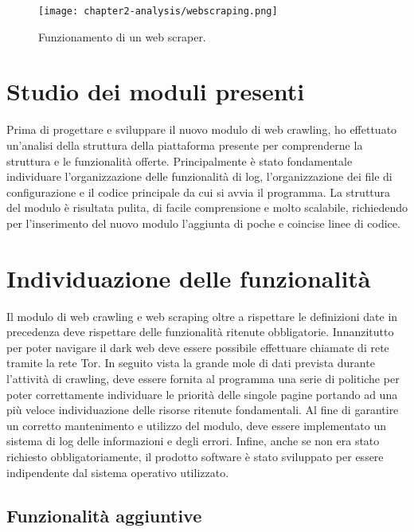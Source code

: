 \begin{figure}[!h] 
    \centering 
    \texttt{[image: chapter2-analysis/webscraping.png]} 
    \caption{Funzionamento di un web scraper.}
\end{figure}


\section{Studio dei moduli presenti}

Prima di progettare e sviluppare il nuovo modulo di web crawling, ho effettuato un’analisi della struttura della piattaforma presente per comprenderne la struttura e le funzionalità offerte. Principalmente è stato fondamentale individuare l'organizzazione delle funzionalità di log, l'organizzazione dei file di configurazione e il codice principale da cui si avvia il programma. La struttura del modulo è risultata pulita, di facile comprensione e molto scalabile, richiedendo per l'inserimento del nuovo modulo l'aggiunta di poche e coincise linee di codice.


\section{Individuazione delle funzionalità}

Il modulo di web crawling e web scraping oltre a rispettare le definizioni date in precedenza deve rispettare delle funzionalità ritenute obbligatorie. Innanzitutto per poter navigare il dark web deve essere possibile effettuare chiamate di rete tramite la rete Tor. In seguito vista la grande mole di dati prevista durante l'attività di crawling, deve essere fornita al programma una serie di politiche per poter correttamente individuare le priorità delle singole pagine portando ad una più veloce individuazione delle risorse ritenute fondamentali. Al fine di garantire un corretto mantenimento e utilizzo del modulo, deve essere implementato un sistema di log delle informazioni e degli errori. Infine, anche se non era stato richiesto obbligatoriamente, il prodotto software è stato sviluppato per essere indipendente dal sistema operativo utilizzato.


\subsection{Funzionalità aggiuntive}

